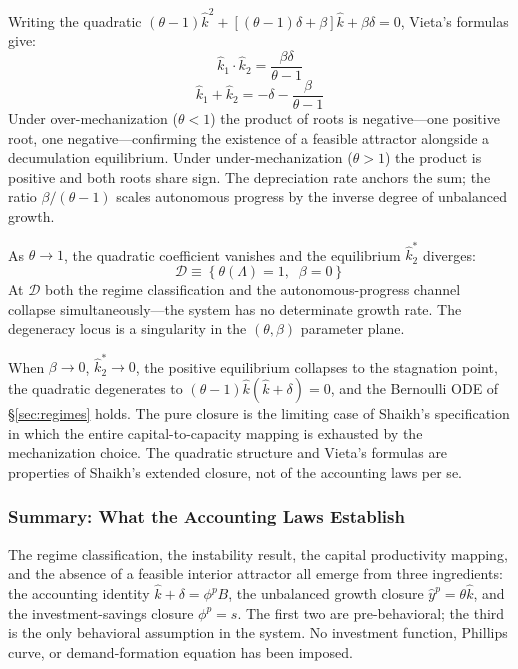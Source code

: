 Writing the quadratic $(\theta - 1)\hat{k}^2 + [(\theta - 1)\delta + \beta]\hat{k} + \beta\delta = 0$, Vieta's formulas give:
%
\begin{equation}\label{eq:vieta_product}
	\hat{k}_1 \cdot \hat{k}_2 = \frac{\beta\delta}{\theta - 1}
\end{equation}
%
\begin{equation}\label{eq:vieta_sum}
	\hat{k}_1 + \hat{k}_2 = -\delta - \frac{\beta}{\theta - 1}
\end{equation}
%
Under over-mechanization ($\theta < 1$) the product of roots is negative---one positive root, one negative---confirming the existence of a feasible attractor alongside a decumulation equilibrium. Under under-mechanization ($\theta > 1$) the product is positive and both roots share sign. The depreciation rate anchors the sum; the ratio $\beta/(\theta - 1)$ scales autonomous progress by the inverse degree of unbalanced growth.

As $\theta \to 1$, the quadratic coefficient vanishes and the equilibrium $\hat{k}_2^*$ diverges:
%
\begin{equation}\label{eq:degeneracy}
	\mathcal{D} \equiv \left\{\theta(\Lambda) = 1,\;\; \beta = 0\right\}
\end{equation}
%
At $\mathcal{D}$ both the regime classification and the autonomous-progress channel collapse simultaneously---the system has no determinate growth rate. The degeneracy locus is a singularity in the $(\theta, \beta)$ parameter plane.

When $\beta \to 0$, $\hat{k}_2^* \to 0$, the positive equilibrium collapses to the stagnation point, the quadratic degenerates to $(\theta - 1)\hat{k}(\hat{k} + \delta) = 0$, and the Bernoulli ODE of \S\ref{sec:regimes} holds. The pure closure is the limiting case of Shaikh's specification in which the entire capital-to-capacity mapping is exhausted by the mechanization choice. The quadratic structure and Vieta's formulas are properties of Shaikh's extended closure, not of the accounting laws per se.



\subsubsection{Summary: What the Accounting Laws Establish}
\label{sec:accounting_summary}

The regime classification, the instability result, the capital productivity mapping, and the absence of a feasible interior attractor all emerge from three ingredients: the accounting identity $\hat{k} + \delta = \phi^p B$, the unbalanced growth closure $\hat{y}^p = \theta\hat{k}$, and the investment-savings closure $\phi^p = s$. The first two are pre-behavioral; the third is the only behavioral assumption in the system. No investment function, Phillips curve, or demand-formation equation has been imposed.

